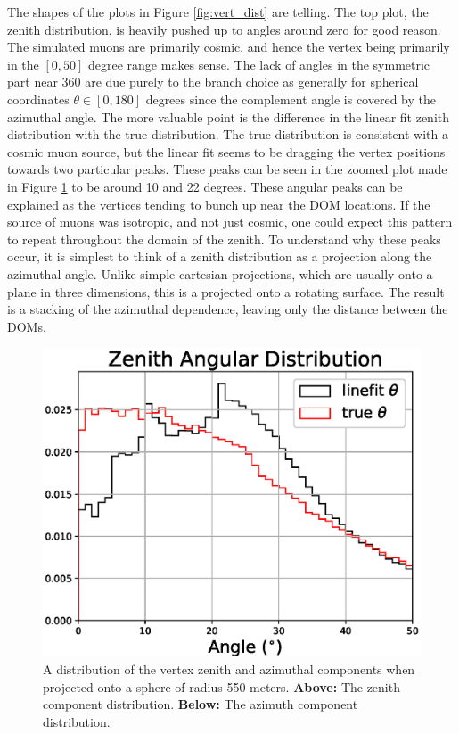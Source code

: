 The shapes of the plots in Figure \ref{fig:vert_dist} are telling. The top plot, the zenith distribution, is heavily pushed up to angles around zero for good reason. The simulated muons are primarily cosmic, and hence the vertex being primarily in the $[0, 50]$ degree range makes sense. The lack of angles in the symmetric part near 360 are due purely to the branch choice as generally for spherical coordinates $\theta \in [0,180]$ degrees since the complement angle is covered by the azimuthal angle. The more valuable point is the difference in the linear fit zenith distribution with the true distribution. The true distribution is consistent with a cosmic muon source, but the linear fit seems to be dragging the vertex positions towards two particular peaks. These peaks can be seen in the zoomed plot made in Figure \ref{fig:vert_dist_zoomed} to be around 10 and 22 degrees. These angular peaks can be explained as the vertices tending to bunch up near the DOM locations. If the source of muons was isotropic, and not just cosmic, one could expect this pattern to repeat throughout the domain of the zenith. To understand why these peaks occur, it is simplest to think of a zenith distribution as a projection along the azimuthal angle. Unlike simple cartesian projections, which are usually onto a plane in three dimensions, this is a projected onto a rotating surface. The result is a stacking of the azimuthal dependence, leaving only the distance between the DOMs. 

\begin{figure}[H]
  \centering
  \includegraphics[width=12cm]{./Figures/reco_plots/zenith_vert_dist_modified_zoomed.eps}
  \caption{A distribution of the vertex zenith and azimuthal components when projected onto a sphere of radius 550 meters. \textbf{Above:} The zenith component distribution. \textbf{Below:} The azimuth component distribution.}
  \label{fig:vert_dist_zoomed}
\end{figure}

